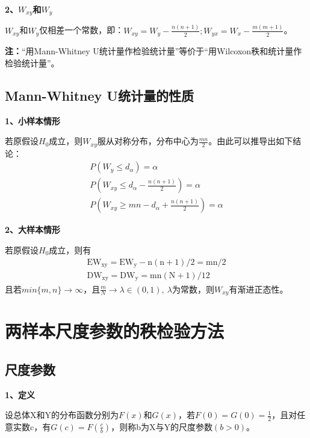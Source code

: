 \documentclass[lang=cn,10pt]{elegantbook}
\begin{document}
\textbf{2、$W_{xy}$和$W_y$}
\begin{theorem}
    $W_{xy}$和$W_{y}$仅相差一个常数，即：$W_{xy} = W_y - \frac{n(n+1)}2;W_{yx} = W_x - \frac{m(m+1)}2$。
\end{theorem}
\textbf{注：}“用Mann-Whitney U统计量作检验统计量”等价于“用Wilcoxon秩和统计量作检验统计量”。

\subsection{Mann-Whitney U统计量的性质}
\textbf{1、小样本情形}
\begin{proposition}
    若原假设$H_0$成立，则$W_{xy}$服从对称分布，分布中心为$\frac{mn}2$。由此可以推导出如下结论：
    \begin{equation*}
        \begin{gathered}
            P(W_y\leq d_{\alpha}) = \alpha \\
            P(W_{xy}\leq d_{\alpha} - \frac{n(n+1)}2)= \alpha \\
            P(W_{xy}\geq mn - d_{\alpha} + \frac{n(n+1)}2)= \alpha
        \end{gathered}
    \end{equation*}
\end{proposition}

\textbf{2、大样本情形}
\begin{proposition}
    若原假设$H_0$成立，则有
    \begin{equation}
        \begin{aligned}
            \mathrm{EW_{xy}=EW_y-n(n+1)/2=mn/2}\\
            \mathrm{DW_{xy}=DW_y=mn(N+1)/12}
        \end{aligned}
    \end{equation}
    且若$min\{m,n\}\rightarrow \infty$，且$\frac{m}N \rightarrow \lambda \in (0,1),~\lambda$为常数，则$W_{xy}$有渐进正态性。
\end{proposition}

\section{两样本尺度参数的秩检验方法}

\subsection{尺度参数}
\textbf{1、定义}
\begin{definition}
    设总体X和Y的分布函数分别为$F(x)$和$G(x)$，若$F(0) = G(0) = \frac12$，且对任意实数c，有$G(c) = F(\frac{c}b)$，则称b为X与Y的尺度参数$(b >0)$。
\end{definition}
\end{document}

